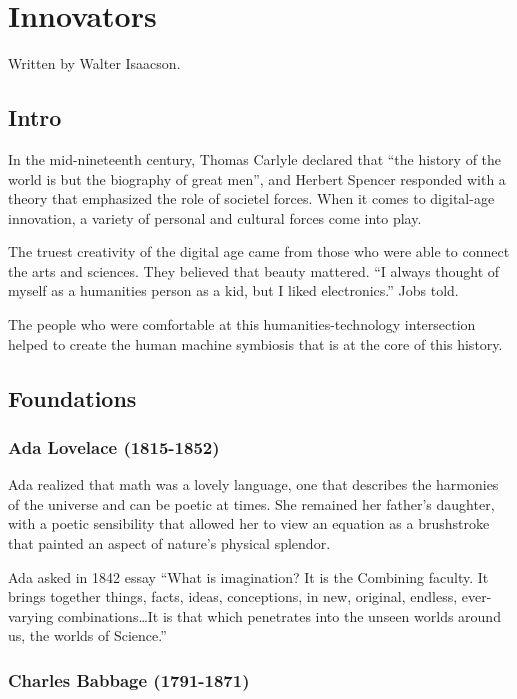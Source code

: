 \chapter{Innovators}
\label{chp:b2}

Written by Walter Isaacson.

\section{Intro}

In the mid-nineteenth century, Thomas Carlyle declared that ``the history of the
world is but the biography of great men'', and Herbert Spencer responded with a
theory that emphasized the role of societel forces. When it comes to digital-age
innovation, a variety of personal and cultural forces come into play.

The truest creativity of the digital age came from those who were able to
connect the arts and sciences. They believed that beauty mattered. ``I always
thought of myself as a humanities person as a kid, but I liked electronics.''
Jobs told.

The people who were comfortable at this humanities-technology intersection
helped to create the human machine symbiosis that is at the core of this
history.

\section{Foundations}

\subsection{Ada Lovelace (1815-1852)}

Ada realized that math was a lovely language, one that describes the harmonies
of the universe and can be poetic at times. She remained her father's daughter,
with a poetic sensibility that allowed her to view an equation as a brushstroke
that painted an aspect of nature's physical splendor.

Ada asked in 1842 essay ``What is imagination? It is the Combining faculty. It
brings together things, facts, ideas, conceptions, in new, original, endless,
ever-varying combinations\ldots It is that which penetrates into the unseen
worlds around us, the worlds of Science.''

\subsection{Charles Babbage (1791-1871)}

